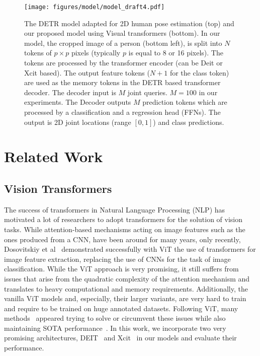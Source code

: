 \documentclass[runningheads]{llncs}
\begin{document}
\begin{figure*}[t]
  \begin{center}
  \texttt{[image: figures/model/model\_draft4.pdf]}
  \caption{
  \label{fig:model}
  The DETR model adapted for 2D human pose estimation (top) and 
  our proposed model using Visual transformers (bottom).
  In our model, the cropped image of a person (bottom left), is split into $N$ tokens of $p \times p$ pixels
  (typically $p$ is equal to 8 or 16 pixels). The tokens are processed by the transformer encoder 
  (can be Deit or Xcit based). The output feature tokens ($N + 1$ for the class token) are used
  as the memory tokens in the DETR based transformer decoder. The decoder input is 
  $M$ joint queries. $M=100$ in our experiments. The Decoder outputs $M$ prediction tokens which are 
  processed by a classification and a regression head (FFNs). The output is 2D joint locations (range $[0,1]$) and class predictions.}
  \end{center}
\end{figure*}

\section{Related Work}
\label{sec:relatedwork}

\subsection{Vision Transformers}
The success of transformers in Natural Language Processing (NLP) has motivated a lot of researchers to adopt transformers for the solution of vision tasks. While attention-based mechanisms acting on image features such as the ones produced from a CNN, have been around for many years, only recently, 
Dosovitskiy et al~\cite{dosovitskiy2020image} demonstrated successfully with ViT the  
use of transformers for image feature extraction, replacing the use of CNNs for 
the task of image classification.
While the ViT approach is very promising, it still suffers from issues that arise from the 
quadratic complexity of the attention mechanism and translates to heavy computational and memory requirements.
Additionally, the vanilla ViT models and, especially, their larger variants, are very hard to train and require to be trained on huge annotated datasets.
Following ViT, many methods~\cite{xiong2021nystr,wang2020linformer,mehta2021mobilevit,yuan2021tokens,zhang2021aggregating}
appeared trying to solve or circumvent these issues while also 
maintaining SOTA performance~\cite{el2021xcit,touvron2021training}. 
In this work, we incorporate two very promising architectures, 
DEIT~\cite{touvron2021training} and Xcit~\cite{el2021xcit} in our models 
and evaluate their performance.
\end{document}
